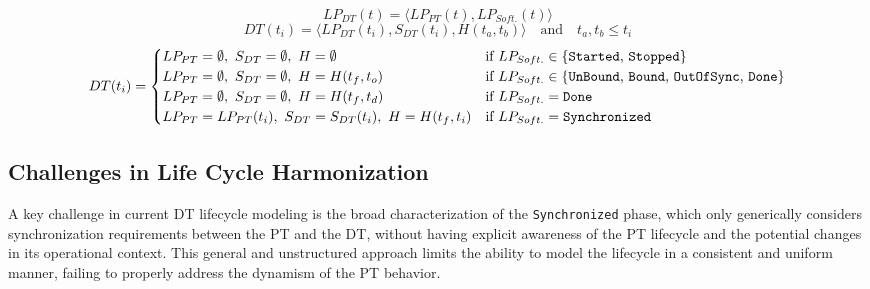 \begin{figure}[t]
    \centering
    \captionsetup{type=equation}
    \begin{minipage}{\textwidth}
         \begin{equation}
            LP_{DT}(t) = \langle  LP_{PT}(t), LP_{Soft.}(t)\rangle
            \label{eq:lpdt_definition}
        \end{equation}
        \begin{equation}
            DT(t_i) = \langle LP_{DT}(t_i), S_{DT}(t_i), H(t_a, t_b)\rangle \quad \text{and} \quad  t_a, t_b \leq t_i
        \label{eq:dt-definition}
        \end{equation}
        \begin{equation}
            DT(t_i) =
            \begin{cases}
                LP_{PT} = \emptyset, \ S_{DT} = \emptyset, \ H = \emptyset & \text{if } LP_{Soft.} \in \{\text{\texttt{Started}, \texttt{Stopped}}\} \\
                LP_{PT} = \emptyset, \ S_{DT} = \emptyset, \ H = H(t_f, t_o) & \text{if } LP_{Soft.} \in \{\text{\texttt{UnBound}, \texttt{Bound}, \texttt{OutOfSync}, \texttt{Done}}\} \\
                LP_{PT} = \emptyset, \ S_{DT} = \emptyset, \ H = H(t_f, t_d) & \text{if } LP_{Soft.} = \text{\texttt{Done}} \\
                LP_{PT} = LP_{PT}(t_i), \ S_{DT} = S_{DT}(t_i), \ H = H(t_f, t_i) & \text{if } LP_{Soft.} = \text{\texttt{Synchronized}}
            \end{cases}
            \label{eq:lpdt_complete_mapping}
        \end{equation}
    \end{minipage}
\end{figure}

\subsection{Challenges in Life Cycle Harmonization}
\label{sec:challenges}

A key challenge in current DT lifecycle modeling is the broad characterization of the \texttt{Synchronized} phase, which 
only generically considers synchronization requirements between the PT and the DT, without having explicit awareness of the PT lifecycle and the potential changes in its operational context.
This general and unstructured approach limits the ability to model the lifecycle in a consistent and uniform manner, failing to properly address the dynamism of the PT behavior. %


